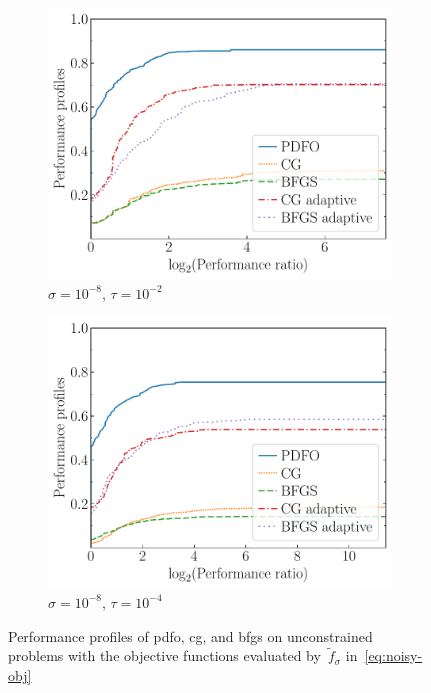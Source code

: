 \documentclass[
    smallextended,  %
    final,          %
]{svjour3}
\newcommand{\obj}{f}
\begin{document}
\begin{figure}[!htb]
\begin{subfigure}{.48\textwidth}
        \includegraphics[width=\textwidth]{perf-noisy-bfgs_cg_pdfo-50-8-2.pdf}
        \caption{$\sigma = 10^{-8}$, $\tau = 10^{-2}$}
    \end{subfigure}
    \hfill
    \begin{subfigure}{.48\textwidth}
        \centering
        \includegraphics[width=\textwidth]{perf-noisy-bfgs_cg_pdfo-50-8-4.pdf}
        \caption{$\sigma = 10^{-8}$, $\tau = 10^{-4}$}
    \end{subfigure}
    \caption{Performance profiles of \gls{pdfo}, \gls{cg}, and \gls{bfgs} on unconstrained problems with the objective functions evaluated by~$\tilde{\obj}_\sigma$ in~\eqref{eq:noisy-obj}}
    \label{fig:noise}
\end{figure}
\end{document}
